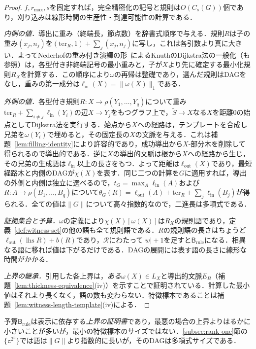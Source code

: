 \begin{proof}
$f,r_{\max},s$を固定すれば，完全精密化の記号と規則は$O(C_s(G))$個であり，刈り込みは線形時間の生産性・到達可能性の計算である．

\emph{内側の値．}導出に重み（終端長，節点数）を辞書式順序で与える．規則$R$は子の重み$(x_j,n_j)$を$(\mathrm{ter}_R,1)+\sum_j(x_j,n_j)$に写し，これは各引数より真に大きい．よってNederhofの重み付き演繹の形~\cite{Nederhof2003}によるKnuthのDijkstra法の一般化（\cite{RamalingamReps1996}も参照）は，各型付き非終端記号の最小重みと，子が$X$より先に確定する最小化規則$R_X$を計算する．この順序により$\omega$の再帰は整礎であり，選んだ規則はDAGをなし，重みの第一成分は$\ell_{\mathrm{in}}(X)=\|\omega(X)\|_1$である．

\emph{外側の値．}各型付き規則$R:X\to\rho(Y_1,\ldots,Y_q)$について重み$\mathrm{ter}_R+\sum_{i\ne j}\ell_{\mathrm{in}}(Y_i)$の辺$X\to Y_j$をもつグラフ上で，$\widetilde S\to X$なる$X$を距離0の始点としてDijkstra法を実行する．始点から$X$への経路は，テンプレートを合成し兄弟を$\omega(Y_i)$で埋めると，その固定長の$X$の文脈を与える．これは補題~\ref{lem:filling-identity}により許容的であり，成功導出から$X$-部分木を削除して得られるので導出的である．逆に$X$の導出的文脈は根から$X$への経路から生じ，その兄弟の生成語は$\ell_{\mathrm{in}}$以上の長さをもつ．よって距離は$\ell_{\mathrm{out}}(X)$であり，最短経路木と内側のDAGが$\chi(X)$を表す．同じ二つの計算を$G$に適用すれば，導出の外側と内側は独立に選べるので，$t_G=\max_A\ell_{\mathrm{in}}(A)$および$R:A\to\rho(B_1,\ldots,B_q)$について$\theta_G(R)=\ell_{\mathrm{out}}(A)+\mathrm{ter}_R+\sum_j\ell_{\mathrm{in}}(B_j)$が得られる．全ての値は$\|G\|$について高々指数的なので，二進長は多項式である．

\emph{証拠集合と予算．}$\omega$の定義により$\chi(X)[\omega(X)]$は$R_X$の規則語であり，定義~\ref{def:witness-set}の他の語も全て規則語である．$R$の規則語の長さはちょうど$\ell_{\mathrm{out}}(\operatorname{lhs}R)+b(R)$であり，$\mathcal R$にわたって$|w|+1$を足すと$\mathsf B_{\mathrm{rule}}$になる．相異なる語に移れば値は下がるだけである．DAGの展開には表す語の長さに線形な時間がかかる．

\emph{上界の継承．}引用した各上界は，\emph{ある}$\omega(X)\in L_X$と導出的文脈$E_B$（補題~\ref{lem:thickness-equivalence}(iv)）を示すことで証明されている．計算した最小値はそれより長くなく，語の数も変わらない．特徴標本であることは補題~\ref{lem:witness-length-template}(iv)による．
\end{proof}

予算$\mathsf B_{\mathrm{rule}}$は表示に依存する\emph{上界の証明書}であり，最悪の場合の上界よりはるかに小さいことが多いが，最小の特徴標本のサイズではない．\ref{subsec:rank-one}節の$\{\mathtt c^{2^n}\}$では語は$\|G\|$より指数的に長いが，そのDAGは多項式サイズである．

